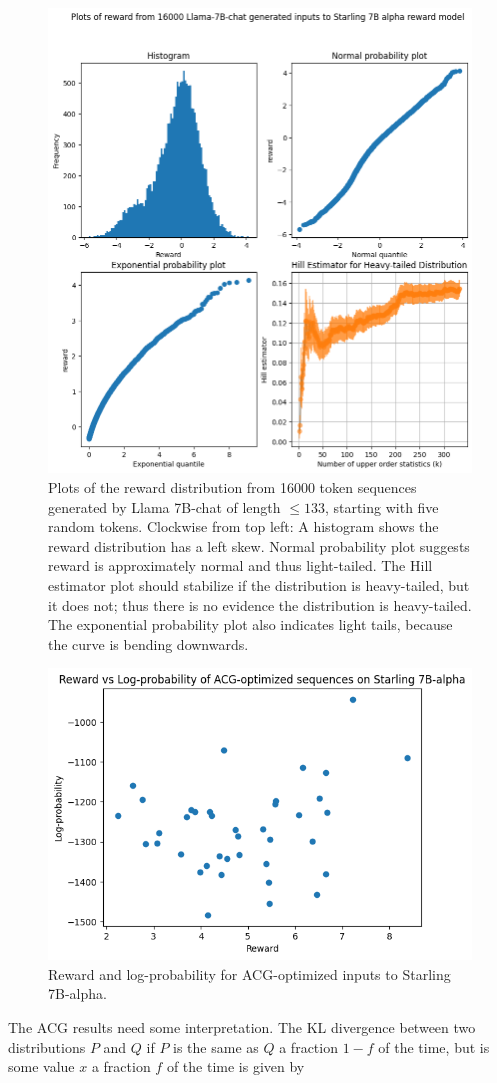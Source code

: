 \documentclass{article}
\begin{document}
\begin{figure}
    \centering
    \includegraphics[width=0.5\linewidth]{images/reward_plots_llama_starling_16k.png}
    \caption{Plots of the reward distribution from 16000 token sequences generated by Llama 7B-chat of length $\le 133$, starting with five random tokens. Clockwise from top left: A histogram shows the reward distribution has a left skew. Normal probability plot suggests reward is approximately normal and thus light-tailed. The Hill estimator plot should stabilize if the distribution is heavy-tailed, but it does not; thus there is no evidence the distribution is heavy-tailed. The exponential probability plot also indicates light tails, because the curve is bending downwards. }
    \label{fig:starling-llama}
\end{figure}

\begin{figure}
    \centering
    \includegraphics[width=0.5\linewidth]{images/acg_results_40.png}
    \caption{Reward and log-probability for ACG-optimized inputs to Starling 7B-alpha.}
    \label{fig:acg-results}
\end{figure}

The ACG results need some interpretation. The KL divergence between two distributions $P$ and $Q$ if $P$ is the same as $Q$ a fraction $1-f$ of the time, but is some value $x$ a fraction $f$ of the time is given by
\end{document}
